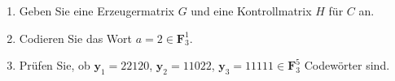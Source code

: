 \begin{aufgabe}
\begin{enumerate}[label=\alph*)]
\item Geben Sie eine Erzeugermatrix $G$ und eine Kontrollmatrix $H$ für $C$ an.
\item Codieren Sie das Wort $a = 2 \in \mathbf{F}_3^1$.
\item Prüfen Sie, ob $\mathbf{y}_1 = 22120$, $\mathbf{y}_2 = 11022$, $\mathbf{y}_3 = 11111 \in \mathbf{F}_3^5$ Codewörter sind.
\end{enumerate}
\end{aufgabe}
